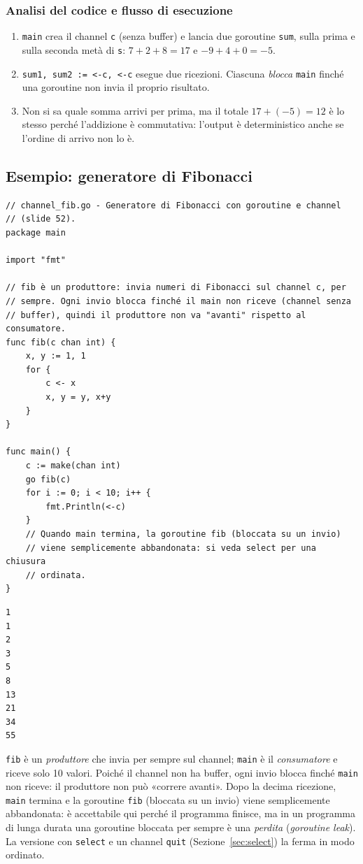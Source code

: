 \documentclass[11pt,a4paper]{report}
\newcommand{\cod}[1]{\texttt{#1}}
\begin{document}
\subsubsection*{Analisi del codice e flusso di esecuzione}

\begin{enumerate}
  \item \cod{main} crea il channel \cod{c} (senza buffer) e lancia due goroutine
        \cod{sum}, sulla prima e sulla seconda metà di \cod{s}:
        $7+2+8=17$ e $-9+4+0=-5$.
  \item \cod{sum1, sum2 := <-c, <-c} esegue due ricezioni. Ciascuna \emph{blocca}
        \cod{main} finché una goroutine non invia il proprio risultato.
  \item Non si sa quale somma arrivi per prima, ma il totale
        $17+(-5)=12$ è lo stesso perché l'addizione è commutativa: l'output
        è deterministico anche se l'ordine di arrivo non lo è.
\end{enumerate}

\subsection{Esempio: generatore di Fibonacci}

\begin{lstlisting}[style=gocode,caption={\texttt{06\_concurrency/channel\_fib.go}}]
// channel_fib.go - Generatore di Fibonacci con goroutine e channel
// (slide 52).
package main

import "fmt"

// fib è un produttore: invia numeri di Fibonacci sul channel c, per
// sempre. Ogni invio blocca finché il main non riceve (channel senza
// buffer), quindi il produttore non va "avanti" rispetto al consumatore.
func fib(c chan int) {
	x, y := 1, 1
	for {
		c <- x
		x, y = y, x+y
	}
}

func main() {
	c := make(chan int)
	go fib(c)
	for i := 0; i < 10; i++ {
		fmt.Println(<-c)
	}
	// Quando main termina, la goroutine fib (bloccata su un invio)
	// viene semplicemente abbandonata: si veda select per una chiusura
	// ordinata.
}
\end{lstlisting}
\begin{lstlisting}[style=output]
1
1
2
3
5
8
13
21
34
55
\end{lstlisting}

\cod{fib} è un \emph{produttore} che invia per sempre sul channel; \cod{main} è il
\emph{consumatore} e riceve solo 10 valori. Poiché il channel non ha buffer, ogni
invio blocca finché \cod{main} non riceve: il produttore non può «correre
avanti». Dopo la decima ricezione, \cod{main} termina e la goroutine \cod{fib}
(bloccata su un invio) viene semplicemente abbandonata: è accettabile qui
perché il programma finisce, ma in un programma di lunga durata una goroutine
bloccata per sempre è una \emph{perdita} (\emph{goroutine leak}). La versione
con \cod{select} e un channel \cod{quit} (Sezione~\ref{sec:select}) la ferma in
modo ordinato.
\end{document}

